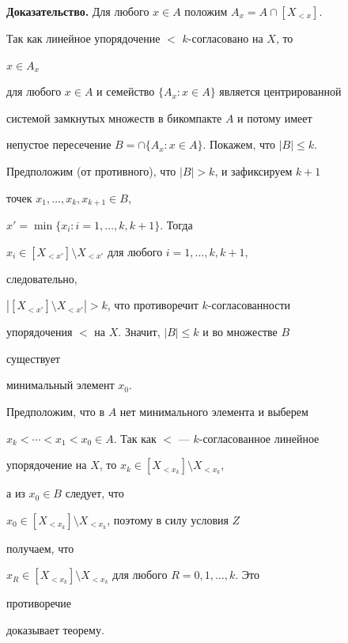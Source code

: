  


{\bf Доказательство.} Для любого $x\in A$ положим $A_x=A\cap[X_{<x}]$. 


Так как линейное упорядочение $<$\; $k$-согласовано на $X$, то 


$x\in A_x$ 


для любого $x\in A$ и семейство $\{A_x:x\in A\}$ является центрированной  


системой замкнутых множеств в бикомпакте $A$ и потому имеет  


непустое пересечение $B=\cap\{A_x:x\in A\}$. Покажем, что $|B|\le k$. 


Предположим (от противного), что $|B|>k$, и зафиксируем $k+1$ 


точек $x_1,\dotsc,x_k,x_{k+1}\in B$,


$x'=\min\{x_i:i=1,\dotsc,k,k+1\}$. Тогда  


$x_i\in[X_{<x'}]\setminus X_{<x'}$ для любого $i=1,\dotsc,k,k+1$, 


следовательно, 


$|[X_{<x'}]\setminus X_{<x'}|>k$, что противоречит $k$-согласованности  


упорядочения $<$ на $X$. Значит, $|B|\le k$ и во множестве $B$ 


существует  


минимальный элемент $x_0$. 


 


Предположим, что в $A$ нет минимального элемента и выберем  


$x_k<\dotsb<x_1<x_0\in A$. Так как $<$ --- $k$-согласованное линейное  


упорядочение на $X$, то $x_k\in[X_{<x_k}]\setminus X_{<x_k}$, 


а из $x_0\in B$ следует, что 


$x_0\in[X_{<x_k}]\setminus X_{<x_k}$, поэтому в силу условия $Z$ 


получаем, что 


$x_R\in[X_{<x_k}]\setminus X_{<x_k}$ для любого $R=0,1,\dotsc,k$. Это 


противоречие 


доказывает теорему. 


 



